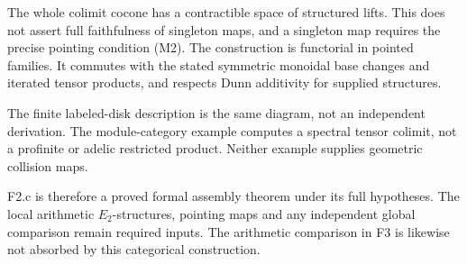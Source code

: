 The whole colimit cocone has a contractible space of structured
lifts. This does not assert full faithfulness of singleton maps,
and a singleton map requires the precise pointing condition
(M2). The construction is functorial in pointed families.
It commutes with the stated symmetric monoidal base changes and
iterated tensor products, and respects Dunn additivity for
supplied structures.

The finite labeled-disk description is the same diagram, not
an independent derivation. The module-category example computes
a spectral tensor colimit, not a profinite or adelic restricted
product. Neither example supplies geometric collision maps.

F2.c is therefore a proved formal assembly theorem under its
full hypotheses. The local arithmetic \(E_2\)-structures,
pointing maps and any independent global comparison remain
required inputs. The arithmetic comparison in F3 is likewise
not absorbed by this categorical construction.
